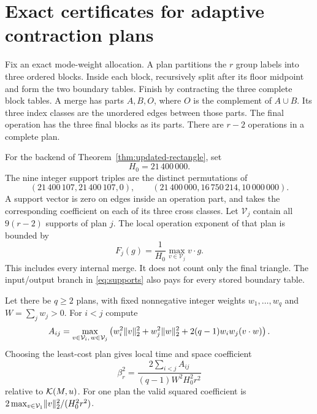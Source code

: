 \section{Exact certificates for adaptive contraction plans}\label{sec:certificates}

Fix an exact mode-weight allocation. A plan partitions the $r$ group labels
into three ordered blocks. Inside each block, recursively split after its
floor midpoint and form the two boundary tables. Finish by contracting the
three complete block tables. A merge has parts $A,B,O$, where $O$ is the
complement of $A\cup B$. Its three index classes are the unordered edges
between those parts. The final operation has the three final blocks as
its parts. There are $r-2$ operations in a complete plan.

For the backend of Theorem~\ref{thm:updated-rectangle}, set
\[
 H_0=21\,400\,000.
\]
The nine integer support triples are the distinct permutations of
\begin{equation}\label{eq:supports}
 (21\,400\,107,21\,400\,107,0),\qquad
 (21\,400\,000,16\,750\,214,10\,000\,000).
\end{equation}
A support vector is zero on edges inside an operation part, and takes
the corresponding coefficient on each of its three cross classes.
Let $\mathcal V_j$ contain all $9(r-2)$ supports of plan $j$.
The local operation exponent of that plan is bounded by
\[
 F_j(g)=\frac1{H_0}\max_{v\in\mathcal V_j}v\cdot g.
\]
This includes every internal merge. It does not count only the final
triangle. The input/output branch in \eqref{eq:supports} also pays for
every stored boundary table.

\begin{lemma}\label{lem:paircertificate}
Let there be $q\ge2$ plans, with fixed nonnegative integer weights
$w_1,\ldots,w_q$ and $W=\sum_jw_j>0$. For $i<j$ compute
\[
 A_{ij}=\max_{v\in\mathcal V_i,\,w\in\mathcal V_j}
 \left(w_i^2\lVert v\rVert_2^2+w_j^2\lVert w\rVert_2^2
             +2(q-1)w_iw_j(v\cdot w)\right).
\]
Choosing the least-cost plan gives local time and space coefficient
\begin{equation}\label{eq:betacertificate}
 \beta_r^2=
 \frac{2\sum_{i<j}A_{ij}}{(q-1)W^2H_0^2r^2}
\end{equation}
relative to $\mathcal K(M,u)$. For one plan the valid squared coefficient is
$2\max_{v\in\mathcal V_1}\lVert v\rVert_2^2/(H_0^2r^2)$.
\end{lemma}

